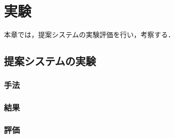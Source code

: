 \chapter{実験}
\label{evaluation}
本章では，提案システムの実験評価を行い，考察する．

\section{提案システムの実験}
\subsection{手法}
\subsection{結果}
\subsection{評価}


